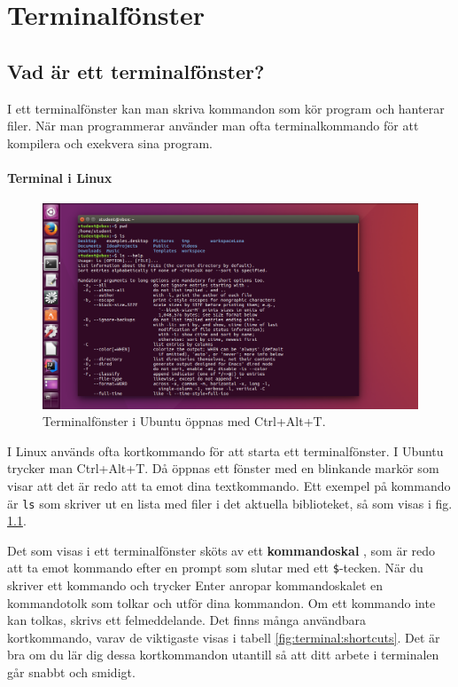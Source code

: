 
\chapter{Terminalfönster}\label{appendix:terminal}

\section{Vad är ett terminalfönster?}

I ett terminalfönster kan man skriva kommandon som kör program och hanterar filer. När man programmerar använder man ofta terminalkommando för att kompilera och exekvera sina program.  
 
\subsubsection{Terminal i Linux}

    \begin{figure}[!b]
    \centering
    \includegraphics[width=1.0\textwidth]{../img/linux-terminal.png}
    \caption{Terminalfönster i Ubuntu öppnas med Ctrl+Alt+T.}
    \label{fig:terminal:linux}
    \end{figure}

I Linux används ofta kortkommando för att starta ett terminalfönster. I Ubuntu trycker man Ctrl+Alt+T.  Då öppnas ett fönster med en blinkande markör som visar att det är redo att ta emot dina textkommando. Ett exempel på kommando är \texttt{ls} som skriver ut en lista med filer i det aktuella biblioteket, så som visas i fig. \ref{fig:terminal:linux}.

Det som visas i ett terminalfönster sköts av ett \textbf{kommandoskal} , som är redo att ta emot kommando efter en prompt som slutar med ett \texttt{\$}-tecken. När du skriver ett kommando och trycker Enter anropar kommandoskalet en kommandotolk som tolkar och utför dina kommandon. Om ett kommando inte kan tolkas, skrivs ett felmeddelande. Det finns många användbara kortkommando, varav de viktigaste visas i tabell \ref{fig:terminal:shortcuts}. Det är bra om du lär dig dessa kortkommandon utantill så att ditt arbete i terminalen går snabbt och smidigt.

